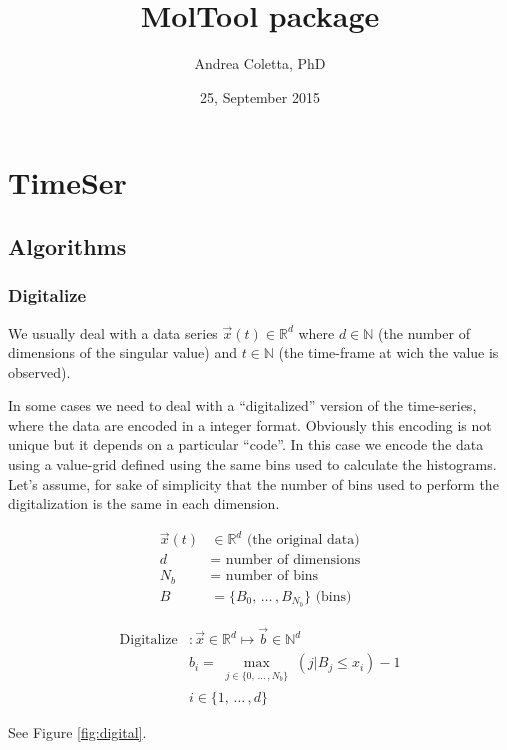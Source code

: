 \documentclass[a4paper]{article}
\title{MolTool package}
\author{Andrea Coletta, PhD}
\date{25, September 2015}
\begin{document}
\maketitle
\section{TimeSer}
\subsection{Algorithms}
\subsubsection{Digitalize} \label{sec:digital}
We usually deal with a data series $\vec{x}(t) \in \mathbb{R}^d$ where $d \in \mathbb{N}$ (the number of dimensions of the singular value) and $t \in \mathbb{N}$ (the time-frame at wich the value is observed). 

In some cases we need to deal with a ``digitalized'' version of the time-series, where the data are encoded in a integer format. Obviously this encoding is not unique but it depends on a particular ``code''. In this case we encode the data using a value-grid defined using the same bins used to calculate the histograms. Let's assume, for sake of simplicity that the number of bins used to perform the digitalization is the same in each dimension.

\begin{align*}
 \vec{x}(t) &\in \mathbb{R}^d \text{ (the original data)}\\
 d          &=   \text{ number of dimensions}\\
 {N_b}      &=   \text{ number of bins}\\
 {B}        &=   \{ B_0,\,\dots\, ,B_{{N_b}} \}\text{ (bins)}
\end{align*}

\begin{align*}
 \text{Digitalize} &: \vec{x} \in \mathbb{R}^d \longmapsto \vec{b} \in \mathbb{N}^d \\
 { }               & b_i = \max_{\substack{j \in \{0,\,\dots\,,N_b\} }} (j | B_j \leq x_i) - 1\\ 
 { }               & i \in \{1,\,\dots\,,d\}
\end{align*}

See Figure \ref{fig:digital}.
\end{document}
